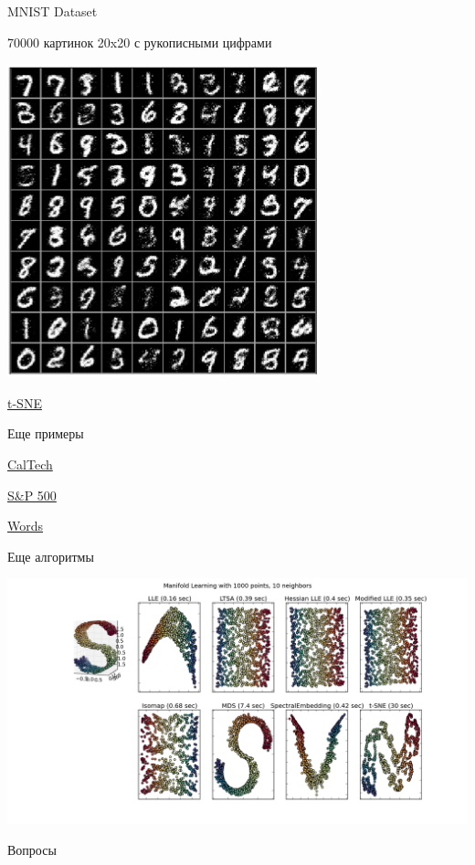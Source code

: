 \documentclass[aspectratio=169]{beamer}
\begin{document}
\begin{frame}{MNIST Dataset}

70000 картинок 20x20 с рукописными цифрами 

\begin{center}
\includegraphics[scale=1.0]{images/mnistdigits.jpg}
\end{center}

\href{http://lvdmaaten.github.io/tsne/examples/mnist_tsne.jpg}{t-SNE}

\end{frame}

\begin{frame}{Еще примеры}

\href{http://lvdmaaten.github.io/tsne/examples/caltech101_tsne.jpg}{CalTech}

\vspace{1em}
\href{http://lvdmaaten.github.io/tsne/examples/SP500_tsne.png}{S\&P 500}

\vspace{1em}
\href{http://www.cs.toronto.edu/~hinton/turian.png}{Words}

\end{frame}

\begin{frame}{Еще алгоритмы}

\begin{center}
\includegraphics[scale=0.27]{images/mainfold.png}
\end{center}

\end{frame}

\begin{frame}[plain]
\begin{center}
{\Large Вопросы}
\end{center}
\end{frame}
\end{document}
